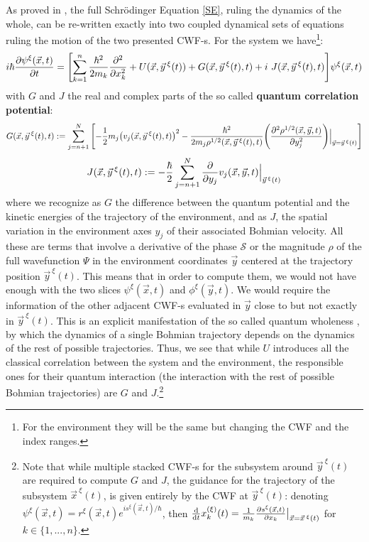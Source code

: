 \documentclass[11pt, a4paper]{article} %
\begin{document}
As proved in \cite{GJ}, the full Schrödinger Equation \eqref{SE}, ruling the dynamics of the whole, can be re-written exactly into two coupled dynamical sets of equations ruling the motion of the two presented CWF-s. For the system we have\footnote{For the environment they will be the same but changing the CWF and the index ranges.}:\vspace{-0.2cm}
\begin{equation}\label{SE.GJ}
i \hbar \pdv{\psi^\xi (\vec{x},t)}{t} = \qty[\sum_{k=1}^n\frac{\hbar^2}{2m_k} \pdv[2]{}{x_k} +  U(\vec{x}, \vec{y}^{\: \xi}(t)) + G(\vec{x}, \vec{y}^{\: \xi}(t),t)+i\ J(\vec{x}, \vec{y}^{\: \xi}(t),t)] \psi^\xi (\vec{x},t)
\end{equation}
with $G$ and $J$ the real and complex parts of the so called {\bf quantum correlation potential}:
\begin{equation}\label{G.Bohm}
G(\vec{x},\vec{y}^{\:\xi}(t),t):=\sum_{j=n+1}^N\qty[-\frac{1}{2}m_j\qty(v_j(\vec{x},\vec{y}^{\: \xi}(t),t))^2-\frac{\hbar^2}{2m_j\rho^{1/2}(\vec{x},\vec{y}^{\:\xi}(t),t)}\qty(\pdv[2]{\rho^{1/2}(\vec{x},\vec{y},t)}{y_j})\Big\rvert_{\vec{y}=\vec{y}^{\:\xi}(t)} ]\vspace{-0.2cm}
\end{equation}
\begin{equation}\label{J.Bohm}
J(\vec{x},\vec{y}^{\:\xi}(t),t):=-\frac{\hbar}{2}\sum_{j=n+1}^N\pdv{}{y_j}v_j(\vec{x},\vec{y},t)\Big\rvert_{\vec{y}^{\, \xi}(t)}
\end{equation}
where we recognize as $G$ the difference between the quantum potential \cite{JordiXavier, Durr} and the kinetic energies of the trajectory of the environment, and as $J$, the spatial variation in the environment axes $y_j$ of their associated Bohmian velocity. All these are terms that involve a derivative of the phase $\mathcal{S}$ or the magnitude $\rho$ of the full wavefunction $\Psi$ in the environment coordinates $\vec{y}$ centered at the trajectory position $\vec{y}^{\:\xi}(t)$. This means that in order to compute them, we would not have enough with the two slices $\psi^\xi(\vec{x},t)$ and $\phi^\xi(\vec{y},t)$. We would require the information of the other adjacent CWF-s evaluated in $\vec{y}$ close to but not exactly in $\vec{y}^{\:\xi}(t)$. This is an explicit manifestation of the so called quantum wholeness \cite{JordiXavier}, by which the dynamics of a single Bohmian trajectory depends on the dynamics of the rest of possible trajectories. Thus, we see that while $U$ introduces all the classical correlation between the system and the environment, the responsible ones for their quantum interaction (the interaction with the rest of possible Bohmian trajectories) are $G$ and $J$.\footnote{Note that while multiple stacked CWF-s for the subsystem around $\vec{y}^{\:\xi}(t)$ are required to compute $G$ and $J$, the guidance for the trajectory of the subsystem $\vec{x}^{\:\xi}(t)$, is given entirely by the CWF at $\vec{y}^{\:\xi}(t)$: denoting $\psi^\xi (\vec{x},t)=r^\xi(\vec{x},t)e^{is^\xi(\vec{x},t)/\hbar}$, then $\dv{}{t}x_k^{(\xi)}(t)=\frac{1}{m_k}\pdv{s^\xi(\vec{x},t)}{x_k}\big\rvert_{\vec{x}=\vec{x}^{\:\xi}(t)}$ for $k\in\{1,...,n\}$.}\vspace{-0.15cm}
\end{document}
